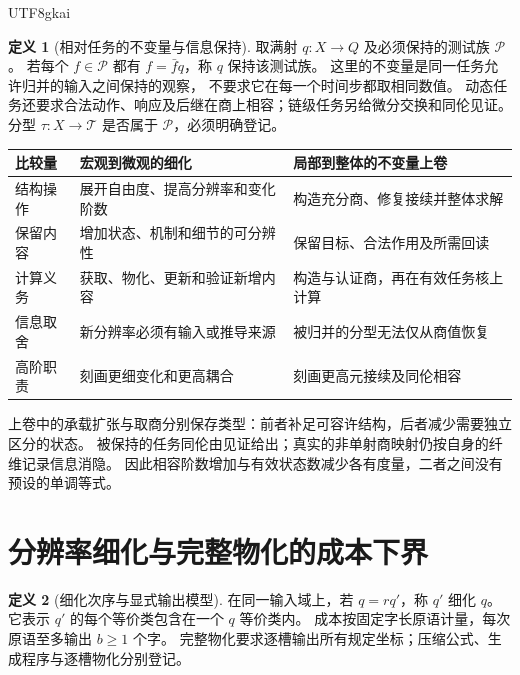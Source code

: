 \documentclass[12pt]{report}
\theoremstyle{definition}
\newtheorem{definition}{定义}[chapter]
\begin{document}
\begin{CJK*}{UTF8}{gkai}
\begin{definition}[相对任务的不变量与信息保持]
取满射 \(q:X\to Q\) 及必须保持的测试族 \(\mathcal P\)。
若每个 \(f\in\mathcal P\) 都有 \(f=\bar f q\)，称 \(q\) 保持该测试族。
这里的不变量是同一任务允许归并的输入之间保持的观察，
不要求它在每一个时间步都取相同数值。
动态任务还要求合法动作、响应及后继在商上相容；链级任务另给微分交换和同伦见证。
分型 \(\tau:X\to\mathcal T\) 是否属于 \(\mathcal P\)，必须明确登记。
\end{definition}

\begin{center}\small
\begin{tabular}{p{}p{}p{}}
\toprule 比较量 & 宏观到微观的细化 & 局部到整体的不变量上卷\\\midrule
结构操作 & 展开自由度、提高分辨率和变化阶数 & 构造充分商、修复接续并整体求解\\
保留内容 & 增加状态、机制和细节的可分辨性 & 保留目标、合法作用及所需回读\\
计算义务 & 获取、物化、更新和验证新增内容 & 构造与认证商，再在有效任务核上计算\\
信息取舍 & 新分辨率必须有输入或推导来源 & 被归并的分型无法仅从商值恢复\\
高阶职责 & 刻画更细变化和更高耦合 & 刻画更高元接续及同伦相容\\
\bottomrule
\end{tabular}
\end{center}
上卷中的承载扩张与取商分别保存类型：前者补足可容许结构，后者减少需要独立区分的状态。
被保持的任务同伦由见证给出；真实的非单射商映射仍按自身的纤维记录信息消隐。
因此相容阶数增加与有效状态数减少各有度量，二者之间没有预设的单调等式。

\section{分辨率细化与完整物化的成本下界}
\begin{definition}[细化次序与显式输出模型]
在同一输入域上，若 \(q=rq'\)，称 \(q'\) 细化 \(q\)。
它表示 \(q'\) 的每个等价类包含在一个 \(q\) 等价类内。
成本按固定字长原语计量，每次原语至多输出 \(b\ge1\) 个字。
完整物化要求逐槽输出所有规定坐标；压缩公式、生成程序与逐槽物化分别登记。
\end{definition}


\end{CJK*}
\end{document}

